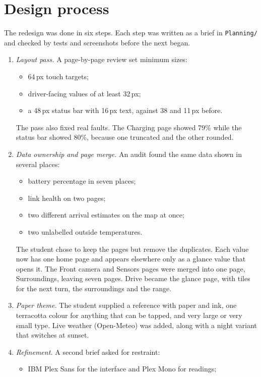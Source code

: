 \section{Design process}

The redesign was done in six steps. Each step was written as a brief in \texttt{Planning/} and checked by tests and screenshots before the next began.

\begin{enumerate}
\item \emph{Layout pass.} A page-by-page review set minimum sizes:
  \begin{itemize}
  \item 64\,px touch targets;
  \item driver-facing values of at least 32\,px;
  \item a 48\,px status bar with 16\,px text, against 38 and 11\,px before.
  \end{itemize}
  The pass also fixed real faults. The Charging page showed 79\% while the status bar showed 80\%, because one truncated and the other rounded.
\item \emph{Data ownership and page merge.} An audit found the same data shown in several places:
  \begin{itemize}
  \item battery percentage in seven places;
  \item link health on two pages;
  \item two different arrival estimates on the map at once;
  \item two unlabelled outside temperatures.
  \end{itemize}
  The student chose to keep the pages but remove the duplicates. Each value now has one home page and appears elsewhere only as a glance value that opens it. The Front camera and Sensors pages were merged into one page, Surroundings, leaving seven pages. Drive became the glance page, with tiles for the next turn, the surroundings and the range.
\item \emph{Paper theme.} The student supplied a reference with paper and ink, one terracotta colour for anything that can be tapped, and very large or very small type. Live weather (Open-Meteo) was added, along with a night variant that switches at sunset.
\item \emph{Refinement.} A second brief asked for restraint:
  \begin{itemize}
  \item IBM Plex Sans for the interface and Plex Mono for readings;

\end{itemize}
\end{enumerate}
